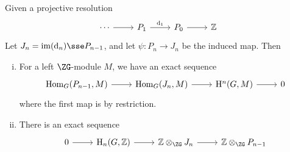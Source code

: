 \documentclass{article}
\begin{document}
\begin{lemma}
    Given a projective resolution
\[\begin{tikzcd}
	\cdots & {P_1} & {P_0} & \Z
	\arrow[from=1-1, to=1-2]
	\arrow["{\dd_1}", from=1-2, to=1-3]
	\arrow[from=1-3, to=1-4]
\end{tikzcd}\]
    Let \(J_n = \im(\dd_n) \sse P_{n-1}\), and let \(\psi : P_n \to J_n\) be the induced map. Then
    \begin{enumerate}[(i)]
        \item For a left \(\ZG\)-module \(M\), we have an exact sequence
        \[\begin{tikzcd}
            {\Hom_G(P_{n-1},M)} & {\Hom_G(J_n, M)} & {\HH^n(G, M)} & 0
            \arrow[from=1-1, to=1-2]
            \arrow[from=1-2, to=1-3]
            \arrow[from=1-3, to=1-4]
        \end{tikzcd}\]
        where the first map is by restriction.
        \item There is an exact sequence
        \[\begin{tikzcd}
            0 & {\HH_n(G,\Z)} & {\Z\otimes_{\ZG} J_n} & {\Z\otimes_{\ZG} P_{n-1}}
            \arrow[from=1-1, to=1-2]
            \arrow[from=1-2, to=1-3]
            \arrow[from=1-3, to=1-4]
        \end{tikzcd}\]
    \end{enumerate}
\end{lemma}
\end{document}
